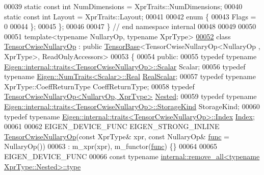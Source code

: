 \begin{DoxyCode}
00039   \textcolor{keyword}{static} \textcolor{keyword}{const} \textcolor{keywordtype}{int} NumDimensions = XprTraits::NumDimensions;
00040   \textcolor{keyword}{static} \textcolor{keyword}{const} \textcolor{keywordtype}{int} Layout = XprTraits::Layout;
00041 
00042   \textcolor{keyword}{enum} \{
00043     Flags = 0
00044   \};
00045 \};
00046 
00047 \}  \textcolor{comment}{// end namespace internal}
00048 
00049 
00050 
00051 \textcolor{keyword}{template}<\textcolor{keyword}{typename} NullaryOp, \textcolor{keyword}{typename} XprType>
\hyperlink{class_eigen_1_1_tensor_cwise_nullary_op}{00052} \textcolor{keyword}{class }\hyperlink{class_eigen_1_1_tensor_cwise_nullary_op}{TensorCwiseNullaryOp} : \textcolor{keyword}{public} \hyperlink{class_eigen_1_1_tensor_base}{TensorBase}<TensorCwiseNullaryOp<NullaryOp
      , XprType>, ReadOnlyAccessors>
00053 \{
00054   \textcolor{keyword}{public}:
00055     \textcolor{keyword}{typedef} \textcolor{keyword}{typename} \hyperlink{struct_eigen_1_1internal_1_1traits}{Eigen::internal::traits<TensorCwiseNullaryOp>::Scalar}
       Scalar;
00056     \textcolor{keyword}{typedef} \textcolor{keyword}{typename} \hyperlink{group___sparse_core___module}{Eigen::NumTraits<Scalar>::Real} 
      \hyperlink{group___sparse_core___module}{RealScalar};
00057     \textcolor{keyword}{typedef} \textcolor{keyword}{typename} XprType::CoeffReturnType CoeffReturnType;
00058     \textcolor{keyword}{typedef} \hyperlink{class_eigen_1_1_tensor_cwise_nullary_op}{TensorCwiseNullaryOp<NullaryOp, XprType>} 
      \hyperlink{class_eigen_1_1_tensor_cwise_nullary_op}{Nested};
00059     \textcolor{keyword}{typedef} \textcolor{keyword}{typename} \hyperlink{struct_eigen_1_1internal_1_1traits}{Eigen::internal::traits<TensorCwiseNullaryOp>::StorageKind}
       StorageKind;
00060     \textcolor{keyword}{typedef} \textcolor{keyword}{typename} \hyperlink{struct_eigen_1_1internal_1_1traits}{Eigen::internal::traits<TensorCwiseNullaryOp>::Index}
       \hyperlink{namespace_eigen_a62e77e0933482dafde8fe197d9a2cfde}{Index};
00061 
00062     EIGEN\_DEVICE\_FUNC EIGEN\_STRONG\_INLINE \hyperlink{class_eigen_1_1_tensor_cwise_nullary_op}{TensorCwiseNullaryOp}(\textcolor{keyword}{const} XprType& xpr, \textcolor{keyword}{
      const} NullaryOp& \hyperlink{structfunc}{func} = NullaryOp())
00063         : m\_xpr(xpr), m\_functor(\hyperlink{structfunc}{func}) \{\}
00064 
00065     EIGEN\_DEVICE\_FUNC
00066     \textcolor{keyword}{const} \textcolor{keyword}{typename} \hyperlink{group___sparse_core___module}{internal::remove\_all<typename XprType::Nested>::type}

\end{DoxyCode}
